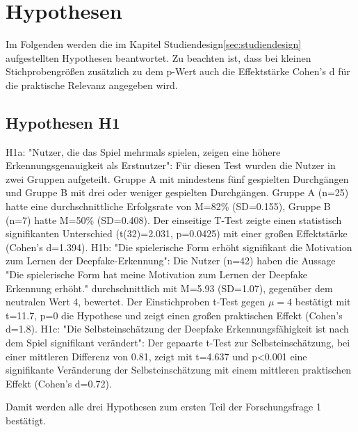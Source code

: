 \section{Hypothesen}
Im Folgenden werden die im Kapitel Studiendesign\ref{sec:studiendesign} aufgestellten Hypothesen beantwortet. 
Zu beachten ist, dass bei kleinen Stichprobengrößen zusätzlich zu dem p-Wert auch die Effektstärke Cohen's d für die praktische Relevanz angegeben wird.
\subsection{Hypothesen H1}
H1a: "Nutzer, die das Spiel mehrmals spielen, zeigen eine höhere Erkennungsgenauigkeit als Erstnutzer":
Für diesen Test wurden die Nutzer in zwei Gruppen aufgeteilt. 
Gruppe A mit mindestens fünf gespielten Durchgängen und Gruppe B mit drei oder weniger gespielten Durchgängen. 
Gruppe A (n=25) hatte eine durchschnittliche Erfolgsrate von M=82\% (SD=0.155), Gruppe B (n=7) hatte M=50\% (SD=0.408). 
Der einseitige T-Test zeigte einen statistisch signifikanten Unterschied (t(32)=2.031, p=0.0425) mit einer großen Effektstärke (Cohen's d=1.394).
H1b: "Die spielerische Form erhöht signifikant die Motivation zum Lernen der Deepfake-Erkennung": 
Die Nutzer (n=42) haben die Aussage "Die spielerische Form hat meine Motivation zum Lernen der Deepfake Erkennung erhöht." 
durchschnittlich mit M=5.93 (SD=1.07), gegenüber dem neutralen Wert 4, bewertet. 
Der Einstichproben t-Test gegen $\mu=4$ bestätigt mit t=11.7, p=0 die Hypothese und zeigt einen großen praktischen Effekt (Cohen's d=1.8).
H1c: "Die Selbsteinschätzung der Deepfake Erkennungsfähigkeit ist nach dem Spiel signifikant verändert": 
Der gepaarte t-Test zur Selbsteinschätzung, bei einer mittleren Differenz von 0.81, zeigt mit t=4.637 und 
p<0.001 eine signifikante Veränderung der Selbsteinschätzung mit einem mittleren praktischen Effekt (Cohen's d=0.72).

Damit werden alle drei Hypothesen zum ersten Teil der Forschungsfrage 1 bestätigt. 

